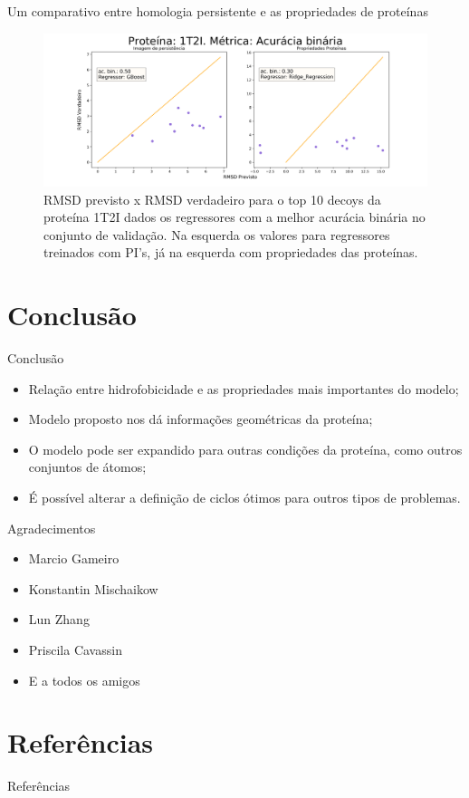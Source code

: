 \documentclass[10pt]{beamer}
\begin{document}
\begin{frame}{Um comparativo entre homologia persistente e as propriedades de proteínas}
\begin{figure}
    \centering
    \includegraphics[width=1.0\textwidth]{images/1t2i_binary.png}
    \caption{RMSD previsto x RMSD verdadeiro para o top 10 decoys da proteína 1T2I dados os
             regressores com a melhor acurácia binária no conjunto de validação. Na 
            esquerda os valores para regressores treinados com PI's, já na esquerda com propriedades
            das proteínas.}
    \label{fig:1t2i_binary}
\end{figure}
\end{frame}

\section{Conclusão}

\begin{frame}{Conclusão}
    \begin{itemize}
        \item Relação entre hidrofobicidade e as propriedades mais importantes do modelo;
        \item Modelo proposto nos dá informações geométricas da proteína; 
        \item O modelo pode ser expandido para outras condições da proteína, como outros conjuntos de átomos; 
        \item É possível alterar a definição de ciclos ótimos para outros tipos de problemas. 
    \end{itemize}
\end{frame}

\begin{frame}{Agradecimentos}
    \begin{itemize}
        \item Marcio Gameiro
        \item Konstantin Mischaikow
        \item Lun Zhang
        \item Priscila Cavassin
        \item E a todos os amigos
    \end{itemize} 
\end{frame}

\section{Referências}

\begin{frame}[allowframebreaks]{Referências}
  
    \nocite{*}
    
 
\end{frame}
\end{document}
